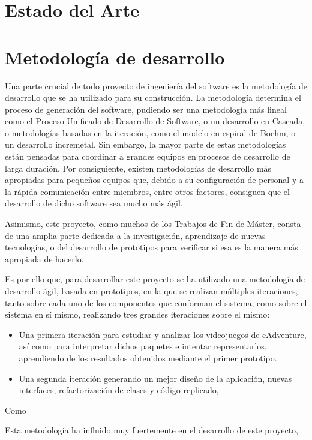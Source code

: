 \section{Estado del Arte}
\label{estadodelarte}

\section{Metodología de desarrollo}
\label{metodologiadedesarrollo}

Una parte crucial de todo proyecto de ingeniería del software es la metodología de desarrollo que se ha utilizado para su construcción. La metodología determina el proceso de generación del software, pudiendo ser una metodología más lineal como el Proceso Unificado de Desarrollo de Software, o un desarrollo en Cascada, o metodologías basadas en la iteración, como el modelo en espiral de Boehm, o un desarrollo incremetal. Sin embargo, la mayor parte de estas metodologías están pensadas para coordinar a grandes equipos en procesos de desarrollo de larga duración. Por consiguiente, existen metodologías de desarrollo más apropiadas para pequeños equipos que, debido a su configuración de personal y a la rápida comunicación entre miembros, entre otros factores, consiguen que el desarrollo de dicho software sea mucho más ágil.

Asimismo, este proyecto, como muchos de los Trabajos de Fin de Máster, consta de una amplia parte dedicada a la investigación, aprendizaje de nuevas tecnologías, o del desarrollo de prototipos para verificar si esa es la manera más apropiada de hacerlo.

Es por ello que, para desarrollar este proyecto se ha utilizado una metodología de desarrollo ágil, basada en prototipos, en la que se realizan múltiples iteraciones, tanto sobre cada uno de los componentes que conforman el sistema, como sobre el sistema en sí mismo, realizando tres grandes iteraciones sobre el mismo: 

\begin{itemize}
	\item 
	Una primera iteración para estudiar y analizar los videojuegos de eAdventure, así como para interpretar dichos paquetes e intentar representarlos, aprendiendo de los resultados obtenidos mediante el primer prototipo.
	\item
	Una segunda iteración generando un mejor diseño de la aplicación, nuevas interfaces, refactorización de clases y código replicado,  
\end{itemize}

Como 



Esta metodología ha influido muy fuertemente en el desarrollo de este proyecto, 

